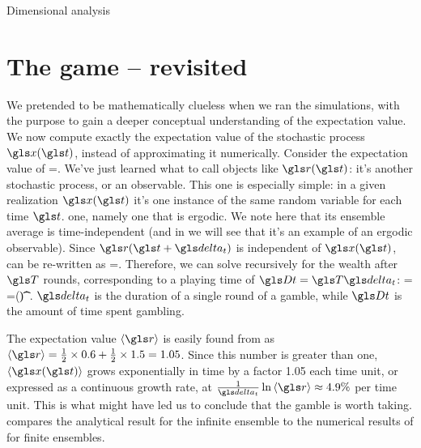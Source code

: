 \begin{excursion}{Dimensional analysis}
%
\end{excursion}

\section{The game -- revisited}
We pretended to be mathematically clueless when we ran the simulations,
with the purpose to gain a deeper conceptual understanding of the expectation 
value. We now compute exactly the expectation value of the stochastic process $\x(\t)$, instead of 
approximating it numerically. Consider the expectation value of   
\be
\ave{\x(\t+\dt)}=\ave{\x(\t)\gr(\t+\dt)}.
\ee
We've just learned what to call objects like $\gr(\t)$: it's another stochastic process, or an observable. This one is  especially simple: in a given realization $\x(\t)$ it's one instance of the same random variable for each time $\t$.  one, namely one that is ergodic. We note here that its ensemble average is time-independent (and in  we will see that it's an example of an ergodic observable).
Since $\gr(\t+\dt)$ is independent of $\x(\t)$,  can be re-written as
\be
\ave{\x(\t+\dt)}=\ave{\x(\t)}\ave{\gr}.
\ee
Therefore, we can solve recursively for the wealth after $\T$ rounds, corresponding to a playing time of $\Dt=\T\dt$:
\be
\ave{\x(\t+\Dt)} = \ave{\x(\t+\T\dt)}=\x(\t)\ave{\gr}^\T.
\ee
$\dt$ is the duration of a single round of a gamble, while $\Dt$ is the amount of time spent gambling.

The expectation value $\ave{\gr}$ is easily found from  
as $\ave{\gr}=\frac{1}{2}\times 0.6 + \frac{1}{2}\times 1.5=1.05$. Since 
this number is greater than one, $\ave{\x(\t)}$ grows exponentially in 
time by a factor 1.05 each time unit, or expressed as a continuous 
growth rate, at $\frac{1}{\dt}\ln \ave{\gr}\approx4.9\%$ per time 
unit. This is what might have led us to
conclude that the gamble is worth taking.  compares the
analytical result for the infinite ensemble to the numerical results 
of  for finite ensembles.


